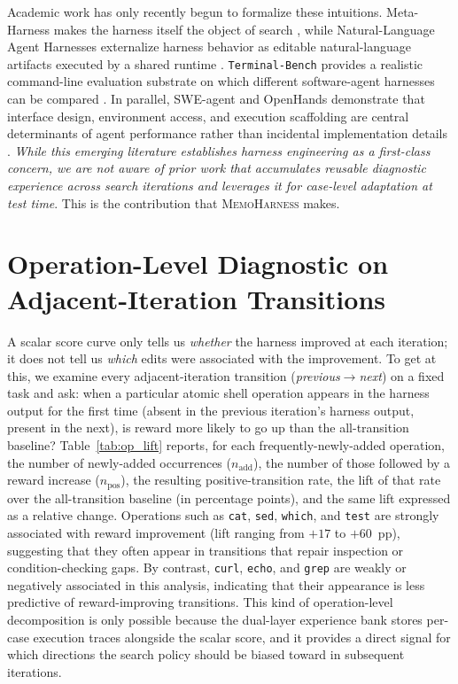 \documentclass{article}
\newcommand{\method}{\textsc{MemoHarness}\xspace}
\begin{document}
Academic work has only recently begun to formalize these intuitions.
Meta-Harness makes the harness itself the object of search
\citep{lee2026metaharness}, while Natural-Language Agent Harnesses externalize
harness behavior as editable natural-language artifacts executed by a shared
runtime \citep{pan2026naturallanguageharnesses}. \texttt{Terminal-Bench}
provides a realistic command-line evaluation substrate on which different
software-agent harnesses can be compared \citep{merrill2026terminalbench}. In
parallel, SWE-agent and OpenHands demonstrate that interface design,
environment access, and execution scaffolding are central determinants of agent
performance rather than incidental implementation details
\citep{yang2024sweagent,wang2024openhands}.
\emph{While this emerging literature establishes harness engineering as a
first-class concern, we are not aware of prior work that accumulates reusable
diagnostic experience across search iterations and leverages it for case-level
adaptation at test time}. This is the contribution that \method
makes.

\section{Operation-Level Diagnostic on Adjacent-Iteration Transitions}
\label{app:op_lift}

A scalar score curve only tells us \emph{whether} the harness improved
at each iteration; it does not tell us \emph{which} edits were
associated with the improvement. To get at this, we examine every
adjacent-iteration transition (\emph{previous}$\to$\emph{next}) on a
fixed task and ask:
when a particular atomic shell operation appears in the harness output
for the first time (absent in the previous iteration's harness output,
present in the next), is reward more likely to go up than the
all-transition baseline? Table~\ref{tab:op_lift} reports, for each
frequently-newly-added operation, the number of newly-added
occurrences ($n_{\text{add}}$), the number of those followed by a
reward increase ($n_{\text{pos}}$), the resulting positive-transition
rate, the lift of that rate over the all-transition baseline (in
percentage points), and the same lift expressed as a relative change.
Operations such as \texttt{cat}, \texttt{sed}, \texttt{which}, and
\texttt{test} are strongly associated with reward improvement (lift
ranging from $+17$ to $+60$~pp), suggesting that they often appear in
transitions that repair inspection or condition-checking gaps. By
contrast, \texttt{curl}, \texttt{echo}, and \texttt{grep} are weakly or
negatively associated in this analysis, indicating that their appearance
is less predictive of reward-improving transitions. This kind of operation-level
decomposition is only possible because the dual-layer experience bank
stores per-case execution traces alongside the scalar score, and it
provides a direct signal for which directions the search policy
should be biased toward in subsequent iterations.
\end{document}
